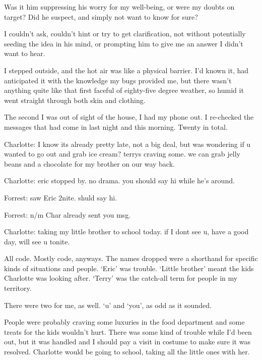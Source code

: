 Was it him suppressing his worry for my well-being, or were my doubts on target?  Did he suspect, and simply not want to know for sure?



I couldn't ask, couldn't hint or try to get clarification, not without potentially seeding the idea in his mind, or prompting him to give me an answer I didn't want to hear.



I stepped outside, and the hot air was like a physical barrier.  I'd known it, had anticipated it with the knowledge my bugs provided me, but there wasn't anything quite like that first faceful of eighty-five degree weather, so humid it went straight through both skin and clothing.



The second I was out of sight of the house, I had my phone out.  I re-checked the messages that had come in last night and this morning.  Twenty in total.



Charlotte:
I know its already pretty late, not a big deal, but was wondering if u wanted to go out and grab ice cream?  terrys craving some.  we can grab jelly beans and a chocolate for my brother on our way back.



Charlotte:
eric stopped by.  no drama.  you should say hi while he's around.



Forrest:
saw Eric 2nite.  shuld say hi.



Forrest:
n/m Char already sent you msg.



Charlotte:
taking my little brother to school today.  if I dont see u, have a good day, will see u tonite.



All code.  Mostly code, anyways.  The names dropped were a shorthand for specific kinds of situations and people.  `Eric' was trouble.  `Little brother' meant the kids Charlotte was looking after.  `Terry' was the catch-all term for people in my territory.



There were two for me, as well.  `u' and `you', as odd as it sounded.



People were probably craving some luxuries in the food department and some treats for the kids wouldn't hurt.  There was some kind of trouble while I'd been out, but it was handled and I should pay a visit in costume to make sure it was resolved.  Charlotte would be going to school, taking all the little ones with her.



